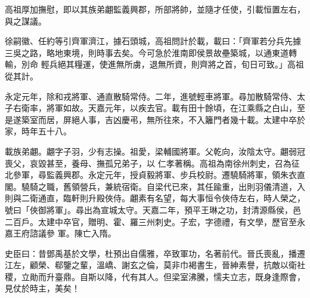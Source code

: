\begin{pinyinscope}
 高祖厚加撫慰，即以其族弟翽監義興郡，所部將帥，並隨才任使，引載恒置左右，與之謀議。



 徐嗣徽、任約等引齊軍濟江，據石頭城，高祖問計於載，載曰：「齊軍若分兵先據三吳之路，略地東境，則時事去矣。今可急於淮南即侯景故壘築城，以通東道轉輸，別命
 輕兵絕其糧運，使進無所虜，退無所資，則齊將之首，旬日可致。」高祖從其計。



 永定元年，除和戎將軍、通直散騎常侍。二年，進號輕車將軍。尋加散騎常侍、太子右衛率，將軍如故。天嘉元年，以疾去官。載有田十餘頃，在江乘縣之白山，至是遂築室而居，屏絕人事，吉凶慶弔，無所往來，不入籬門者幾十載。太建中卒於家，時年五十八。



 載族弟翽。翽字子羽，少有志操。祖愛，梁輔國將軍。父乾向，汝陰太守。翽弱冠喪父，哀毀甚至，養母、撫孤兄弟子，以
 仁孝著稱。高祖為南徐州刺史，召為征北參軍，尋監義興郡。永定元年，授貞毅將軍、步兵校尉。遷驍騎將軍，領朱衣直閣。驍騎之職，舊領營兵，兼統宿衛。自梁代已來，其任踰重，出則羽儀清道，入則與二衛通直，臨軒則升殿俠侍。翽素有名望，每大事恒令俠侍左右，時人榮之，號曰「俠御將軍」。尋出為宣城太守。天嘉二年，預平王琳之功，封清源縣侯，邑二百戶。太建中卒官，贈明、霍、羅三州刺史。子宏，字德禮，有文學，歷官至永嘉王府諮議參
 軍。陳亡入隋。



 史臣曰：昔鄧禹基於文學，杜預出自儒雅，卒致軍功，名著前代。晉氏喪亂，播遷江左，顧榮、郗鑒之輩，溫嶠、謝玄之倫，莫非巾褐書生，晉紳素譽，抗敵以衛社稷，立勛而升臺鼎。自斯以降，代有其人。但梁室沸騰，懦夫立志，既身逢際會，見仗於時主，美矣！



\end{pinyinscope}